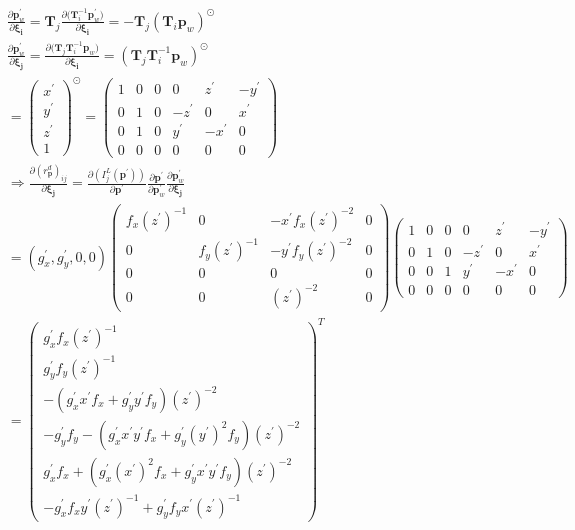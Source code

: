 \documentclass{article}
\begin{document}
\begin{CJK*}{GBK}{song}
\begin{equation}\left.\begin{aligned}
&
\frac{\partial{\textbf{p}^{'}_{w}}}{\partial{\boldsymbol{\xi_{i}}}}=\textbf{T}_j
\frac{\partial{(\textbf{T}_i^{-1}\textbf{p}^{'}_{w}})}{\partial{\boldsymbol{\xi_{i}}}}
=-\textbf{T}_j(\textbf{T}_i\textbf{p}_w)^{\odot}
\\&
\frac{\partial{\textbf{p}^{'}_{w}}}{\partial{\boldsymbol{\xi_{j}}}}=
\frac{\partial{(\textbf{T}_j\textbf{T}_i^{-1}\textbf{p}_{w}})}{\partial{\boldsymbol{\xi_{i}}}}
=(\textbf{T}_j\textbf{T}_i^{-1}\textbf{p}_w)^{\odot}
\\&
=\begin{pmatrix}
x^{'}\\y^{'}\\z^{'}\\1
\end{pmatrix}^{\odot}
=\begin{pmatrix}
  1&0&0&     0&z^{'} &-y^{'}
\\0&1&0&-z^{'}&0     &x^{'}
\\0&1&0& y^{'}&-x^{'}&0
\\0&0&0&0&0&0
\end{pmatrix}
\\&
\Rightarrow
\frac{\partial{(r^{d}_{\textbf{p}})_{ij}}}{\partial{\boldsymbol{\xi_{j}}}}=
\frac{\partial{(I^L_j(\textbf{p}^{'}))}}{\partial{\textbf{p}^{'}}}
\frac{\partial{\textbf{p}^{'}}}{\partial{\textbf{p}^{'}_{w}}}
\frac{\partial{\textbf{p}^{'}_{w}}}{\partial{\boldsymbol{\xi_{j}}}}
\\&
=(g_x^{'},g_y^{'},0,0)
\begin{pmatrix}
f_x(z^{'})^{-1}&0&-x^{'}f_x(z^{'})^{-2}&0
\\0&f_y(z^{'})^{-1}&-y^{'}f_y(z^{'})^{-2}&0
\\0&0&0&0
\\0&0&(z^{'})^{-2}&0
\end{pmatrix}
\begin{pmatrix}
  1&0&0&     0&z^{'} &-y^{'}
\\0&1&0&-z^{'}&0     &x^{'}
\\0&0&1& y^{'}&-x^{'}&0
\\0&0&0&0&0&0
\end{pmatrix}
\\&
=\begin{pmatrix}
 g_x^{'}f_x(z^{'})^{-1}
\\g_y^{'}f_y(z^{'})^{-1}
\\-(g_x^{'}x^{'}f_x + g_y^{'}y^{'}f_y)(z^{'})^{-2}
\\-g_y^{'}f_y-(g_x^{'}x^{'}y^{'}f_x+g_y^{'}(y^{'})^{2}f_y)(z^{'})^{-2}
\\g_x^{'}f_x +(g_x^{'}(x^{'})^{2}f_x+g_y^{'}x^{'}y^{'}f_y)(z^{'})^{-2}
\\-g_x^{'}f_xy^{'}(z^{'})^{-1}+g_y^{'}f_yx^{'}(z^{'})^{-1}
\end{pmatrix}^{T}
\end{aligned}\tag{2.2}\right.\end{equation}


\end{CJK*}
\end{document}
